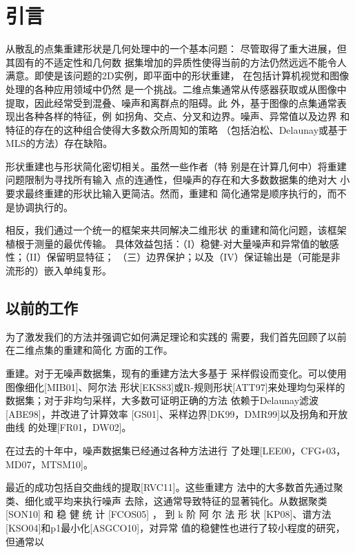 \section{引言}

从散乱的点集重建形状是几何处理中的一个基本问题：
尽管取得了重大进展，但其固有的不适定性和几何数
据集增加的异质性使得当前的方法仍然远远不能令人
满意。即使是该问题的2D实例，即平面中的形状重建，
在包括计算机视觉和图像处理的各种应用领域中仍然
是一个挑战。二维点集通常从传感器获取或从图像中
提取，因此经常受到混叠、噪声和离群点的阻碍。此
外，基于图像的点集通常表现出各种各样的特征，例
如拐角、交点、分叉和边界。噪声、异常值以及边界
和特征的存在的这种组合使得大多数众所周知的策略
（包括泊松、Delaunay或基于MLS的方法）存在缺陷。

形状重建也与形状简化密切相关。虽然一些作者（特
别是在计算几何中）将重建问题限制为寻找所有输入
点的连通性，但噪声的存在和大多数数据集的绝对大
小要求最终重建的形状比输入更简洁。然而，重建和
简化通常是顺序执行的，而不是协调执行的。

相反，我们通过一个统一的框架来共同解决二维形状
的重建和简化问题，该框架植根于测量的最优传输。
具体效益包括：（I）稳健-对大量噪声和异常值的敏感性；（II）保留明显特征；
（三）边界保护；以及（IV）保证输出是（可能是非
流形的）嵌入单纯复形。

\subsection{以前的工作}

为了激发我们的方法并强调它如何满足理论和实践的
需要，我们首先回顾了以前在二维点集的重建和简化
方面的工作。

重建。对于无噪声数据集，现有的重建方法大多基于
采样假设而变化。可以使用图像细化[MIB01]、阿尔法
形状[EKS83]或R-规则形状[ATT97]来处理均匀采样的
数据集；对于非均匀采样，大多数可证明正确的方法
依赖于Delaunay滤波[ABE98]，并改进了计算效率
[GS01]、采样边界[DK99，DMR99]以及拐角和开放曲线
的处理[FR01，DW02]。

在过去的十年中，噪声数据集已经通过各种方法进行
了处理[LEE00，CFG∗03，MD07，MTSM10]。

最近的成功包括自交曲线的提取[RVC11]。这些重建方
法中的大多数首先通过聚类、细化或平均来执行噪声
去除，这通常导致特征的显著钝化。从数据聚类
[SON10] 和 稳 健 统 计 [FCOS05] ， 到 k 阶 阿 尔 法 形 状
[KP08]、谱方法[KSO04]和p1最小化[ASGCO10]，对异常
值的稳健性也进行了较小程度的研究，但通常以